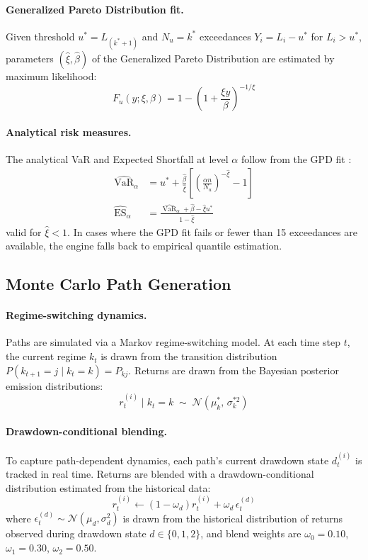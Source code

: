 \documentclass[12pt]{article}
\newcommand{\var}{\operatorname{VaR}}
\newcommand{\es}{\operatorname{ES}}
\begin{document}
\paragraph{Generalized Pareto Distribution fit.}
Given threshold $u^* = L_{(k^*+1)}$ and $N_u = k^*$ exceedances
$Y_i = L_i - u^*$ for $L_i > u^*$, parameters $(\hat\xi, \hat\beta)$ of the
Generalized Pareto Distribution are estimated by maximum likelihood:
\begin{equation}
  F_u(y;\xi,\beta) = 1 - \left(1 + \frac{\xi y}{\beta}\right)^{-1/\xi}
\end{equation}

\paragraph{Analytical risk measures.}
The analytical VaR and Expected Shortfall at level $\alpha$ follow from the GPD
fit \citep{mcneil2000}:
\begin{align}
  \widehat{\var}_\alpha &= u^* + \frac{\hat\beta}{\hat\xi}
    \left[\left(\frac{\alpha n}{N_u}\right)^{-\hat\xi} - 1\right]
  \label{eq:gpd_var} \\[4pt]
  \widehat{\es}_\alpha  &= \frac{\widehat{\var}_\alpha + \hat\beta - \hat\xi u^*}
    {1 - \hat\xi}
  \label{eq:gpd_es}
\end{align}
valid for $\hat\xi < 1$. In cases where the GPD fit fails or fewer than 15 exceedances
are available, the engine falls back to empirical quantile estimation.

\subsection{Monte Carlo Path Generation}

\paragraph{Regime-switching dynamics.}
Paths are simulated via a Markov regime-switching model. At each time step $t$,
the current regime $k_t$ is drawn from the transition distribution
$P(k_{t+1} = j \mid k_t = k) = P_{kj}$. Returns are drawn from the Bayesian
posterior emission distributions:
\begin{equation}
  r_t^{(i)} \mid k_t = k \;\sim\; \mathcal{N}(\mu_k^*,\, \sigma_k^{*2})
\end{equation}

\paragraph{Drawdown-conditional blending.}
To capture path-dependent dynamics, each path's current drawdown state $d_t^{(i)}$
is tracked in real time. Returns are blended with a drawdown-conditional distribution
estimated from the historical data:
\begin{equation}
  r_t^{(i)} \leftarrow (1 - \omega_d) r_t^{(i)} + \omega_d \,\epsilon_t^{(d)}
\end{equation}
where $\epsilon_t^{(d)} \sim \mathcal{N}(\mu_d, \sigma_d^2)$ is drawn from the
historical distribution of returns observed during drawdown state $d \in \{0, 1, 2\}$,
and blend weights are $\omega_0 = 0.10$, $\omega_1 = 0.30$, $\omega_2 = 0.50$.
\end{document}
